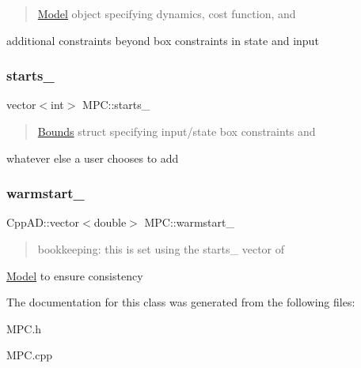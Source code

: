 \begin{quote}
\mbox{\hyperlink{classModel}{Model}} object specifying dynamics, cost function, and \end{quote}
additional constraints beyond box constraints in state and input \mbox{\label{classMPC_af52144a70629c4809d28790fd7c0fdf3}} 
\subsubsection{\texorpdfstring{starts\+\_\+}{starts\_}}
{\footnotesize\ttfamily vector$<$int$>$ M\+P\+C\+::starts\+\_\+\hspace{0.3cm}{\ttfamily [protected]}}

\begin{quote}
\mbox{\hyperlink{structBounds}{Bounds}} struct specifying input/state box constraints and \end{quote}
whatever else a user chooses to add \mbox{\label{classMPC_a303dcbda2e7d051f5f8a34e01bc414bc}} 
\subsubsection{\texorpdfstring{warmstart\+\_\+}{warmstart\_}}
{\footnotesize\ttfamily Cpp\+A\+D\+::vector$<$double$>$ M\+P\+C\+::warmstart\+\_\+\hspace{0.3cm}{\ttfamily [protected]}}

\begin{quote}
bookkeeping\+: this is set using the starts\+\_\+ vector of \end{quote}
\mbox{\hyperlink{classModel}{Model}} to ensure consistency 

The documentation for this class was generated from the following files\+:\begin{DoxyCompactItemize}
\item 
M\+P\+C.\+h\item 
M\+P\+C.\+cpp\end{DoxyCompactItemize}

